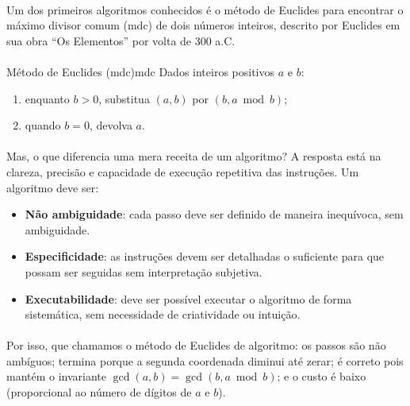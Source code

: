 \documentclass[12pt,a4paper]{article}
\def\emph#1{#1}%
\begin{document}
\paragraph{}
Um dos primeiros algoritmos conhecidos é o \emph{método de Euclides} para encontrar o máximo divisor comum (mdc) de dois números inteiros, descrito por Euclides em sua obra ``Os Elementos'' por volta de 300 a.C.

\paragraph{}
\begin{algobox}{Método de Euclides (mdc)}{mdc}
    Dados inteiros positivos $a$ e $b$:
    \begin{enumerate}\setlength{\itemsep}{2pt}
        \item enquanto $b>0$, substitua $(a,b)$ por $(b, a\bmod b)$;
        \item quando $b=0$, devolva $a$.
    \end{enumerate}
\end{algobox}

\paragraph{}
Mas, o que diferencia uma mera receita de um algoritmo? A resposta está na clareza, precisão e capacidade de execução repetitiva das instruções. Um algoritmo deve ser:
\begin{itemize}\setlength{\itemsep}{2pt}
    \item \textbf{Não ambiguidade}: cada passo deve ser definido de maneira inequívoca, sem ambiguidade.
    \item \textbf{Especificidade}: as instruções devem ser detalhadas o suficiente para que possam ser seguidas sem interpretação subjetiva.
    \item \textbf{Executabilidade}: deve ser possível executar o algoritmo de forma sistemática, sem necessidade de criatividade ou intuição.
\end{itemize}

\paragraph{}
Por isso, que chamamos o método de Euclides de algoritmo: os passos são não ambíguos; termina porque a segunda coordenada diminui até zerar; é correto pois mantém o invariante $\gcd(a,b)=\gcd(b,a\bmod b)$; e o custo é baixo (proporcional ao número de dígitos de $a$ e $b$).
\end{document}
